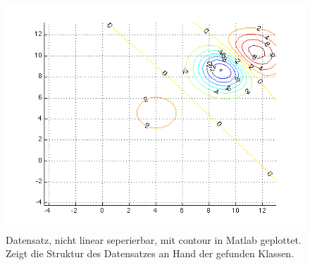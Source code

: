 \documentclass[12pt]{article}
\begin{document}
	
	
\begin{figure}[htp]
	\centering
	\includegraphics[width=1\textwidth]{contour}
	\caption{Datensatz, nicht linear seperierbar, mit contour in Matlab geplottet. Zeigt die Struktur des Datensatzes an Hand der gefunden Klassen.}
	\label{fig:contour}
\end{figure}
\end{document}

